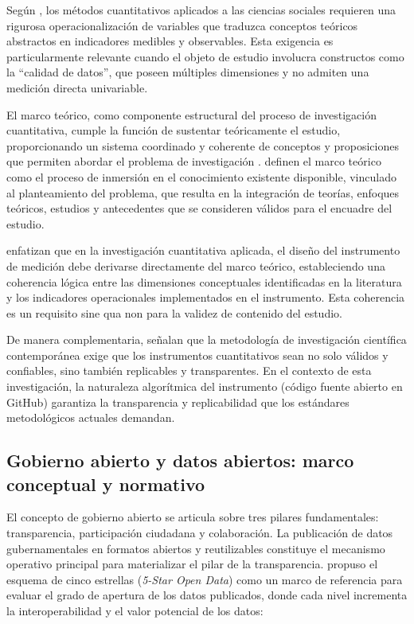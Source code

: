 \documentclass[12pt,letterpaper]{article}
\begin{document}
Según \textcite{saenz2014}, los métodos cuantitativos aplicados a las ciencias sociales requieren una rigurosa operacionalización de variables que traduzca conceptos teóricos abstractos en indicadores medibles y observables. Esta exigencia es particularmente relevante cuando el objeto de estudio involucra constructos como la ``calidad de datos'', que poseen múltiples dimensiones y no admiten una medición directa univariable.

El marco teórico, como componente estructural del proceso de investigación cuantitativa, cumple la función de sustentar teóricamente el estudio, proporcionando un sistema coordinado y coherente de conceptos y proposiciones que permiten abordar el problema de investigación \parencite{rojas2013}. \textcite{hernandez2014} definen el marco teórico como el proceso de inmersión en el conocimiento existente disponible, vinculado al planteamiento del problema, que resulta en la integración de teorías, enfoques teóricos, estudios y antecedentes que se consideren válidos para el encuadre del estudio.

\textcite{polania2020} enfatizan que en la investigación cuantitativa aplicada, el diseño del instrumento de medición debe derivarse directamente del marco teórico, estableciendo una coherencia lógica entre las dimensiones conceptuales identificadas en la literatura y los indicadores operacionales implementados en el instrumento. Esta coherencia es un requisito sine qua non para la validez de contenido del estudio.

De manera complementaria, \textcite{vizcaino2023} señalan que la metodología de investigación científica contemporánea exige que los instrumentos cuantitativos sean no solo válidos y confiables, sino también replicables y transparentes. En el contexto de esta investigación, la naturaleza algorítmica del instrumento (código fuente abierto en GitHub) garantiza la transparencia y replicabilidad que los estándares metodológicos actuales demandan.

\subsection{Gobierno abierto y datos abiertos: marco conceptual y normativo}

El concepto de gobierno abierto se articula sobre tres pilares fundamentales: transparencia, participación ciudadana y colaboración. La publicación de datos gubernamentales en formatos abiertos y reutilizables constituye el mecanismo operativo principal para materializar el pilar de la transparencia. \textcite{bernerslee2006} propuso el esquema de cinco estrellas (\textit{5-Star Open Data}) como un marco de referencia para evaluar el grado de apertura de los datos publicados, donde cada nivel incrementa la interoperabilidad y el valor potencial de los datos:
\end{document}
